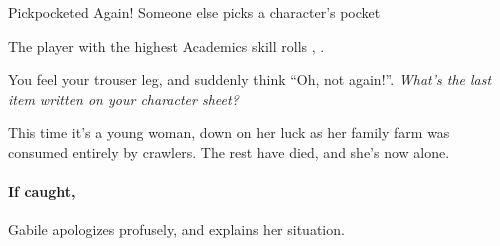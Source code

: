 
{Pickpocketed Again!}%
{Someone else picks a character's pocket}%

The player with the highest Academics \gls{skill} rolls , \tn[8].

\begin{boxtext}
  You feel your trouser leg, and suddenly think ``Oh, not again!''.  \textit{What's the last item written on your character sheet?}
\end{boxtext}

This time it's a young woman, down on her luck as her family farm was consumed entirely by \glspl{crawler}.
The rest have died, and she's now alone.

\paragraph{If caught,}
Gabile apologizes profusely, and explains her situation.


